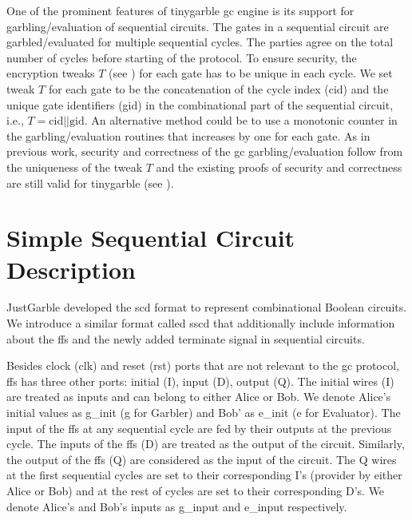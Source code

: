One of the prominent features of \gls{tinygarble} \acrshort{gc} engine is its support for garbling/evaluation of sequential circuits.
The gates in a sequential circuit are garbled/evaluated for multiple sequential cycles.
The parties agree on the total number of cycles before starting of the protocol.
To ensure security, the encryption tweaks $T$ (see ) for each gate has to be unique in each cycle\cite[Sect. 3.4]{henecka2013faster}.
We set tweak $T$ for each gate to be the concatenation of the cycle index (cid) and the unique gate identifiers (gid) in the combinational part of the sequential circuit, i.e., $T = \textrm{cid} || \textrm{gid}$.
An alternative method could be to use a monotonic counter in the garbling/evaluation routines that increases by one for each gate.
As in previous work, security and correctness of the \acrshort{gc} garbling/evaluation follow from the uniqueness of the tweak $T$ and the existing proofs of security and correctness are still valid for \gls{tinygarble} (see \cite{lindell2009proof, bellare2013efficient, zahur2015two}).


\section{Simple Sequential Circuit Description}\label{sec:engine-sscd}
JustGarble \cite{bellare2013efficient} developed the \acrfull{scd} format to represent combinational Boolean circuits.
We introduce a similar format called \acrfull{sscd} that additionally include information about the \acrshort{ff}s and the newly added terminate signal in sequential circuits.

Besides clock (clk) and reset (rst) ports that are not relevant to the \acrshort{gc} protocol, \acrshort{ff}s has three other ports: initial (I), input (D), output (Q).
The initial wires (I) are treated as inputs and can belong to either Alice or Bob.
We denote Alice's initial values as g\_init (g for Garbler) and Bob' as e\_init (e for Evaluator).
The input of the \acrshort{ff}s at any sequential cycle are fed by their outputs at the previous cycle.
The inputs of the \acrshort{ff}s (D) are treated as the output of the circuit.
Similarly, the output of the \acrshort{ff}s (Q) are considered as the input of the circuit.
The Q wires at the first sequential cycles are set to their corresponding I's (provider by either Alice or Bob) and at the rest of cycles are set to their corresponding D's.
We denote Alice's and Bob's inputs as g\_input and e\_input respectively.

